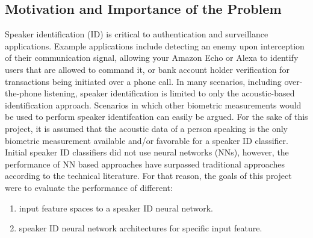 \documentclass{article}
\begin{document}
\subsection{Motivation and Importance of the Problem}
Speaker identification (ID) is critical to authentication and surveillance applications. 
Example applications include detecting an enemy upon interception of their communication signal, allowing your Amazon Echo or Alexa to identify users that are allowed to command it, or bank account holder verification for transactions being initiated over a phone call.
In many scenarios, including over-the-phone listening, speaker identification is limited to only the acoustic-based identification approach. Scenarios in which other biometric measurements would be used to perform speaker identifcation can easily be argued.
For the sake of this project, it is assumed that the acoustic data of a person speaking is the only biometric measurement available and/or favorable for a speaker ID classifier.
Initial speaker ID classifiers did not use neural networks (NNs), however, the performance of NN based approaches have surpassed traditional approaches according to the technical literature.
For that reason, the goals of this project were to evaluate the performance of different:
\begin{enumerate}
  \item input feature spaces to a speaker ID neural network.
  \item speaker ID neural network architectures for specific input feature.
\end{enumerate}
\end{document}
